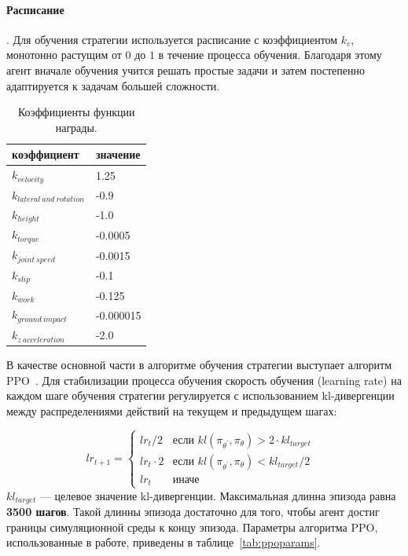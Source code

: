 \paragraph{Расписание}. Для обучения стратегии используется расписание с коэффициентом  $k_c$, монотонно растущим от $0$ до $1$ в течение процесса обучения. Благодаря этому агент вначале обучения учится решать простые задачи и затем постепенно адаптируется к задачам большей сложности.

\begin{table} [htbp]
    \centering
    \begin{threeparttable}
        \caption{Коэффициенты функции награды.}\label{tab:rcoeff}
        \begin{tabular}{| p{8cm} || p{8cm} |}
            \hline
            \hline
            коэффициент & значение \\
            \hline
            $k_{velocity}$ &	1.25 \\
            $k_{lateral\ and\ rotation}$ &	-0.9 \\
            $k_{height}$	& -1.0 \\
            $k_{torque}$	& -0.0005 \\ 
            $k_{joint\ speed}$ &	-0.0015 \\
            $k_{slip}$ &	-0.1 \\
            $k_{work}$ &	-0.125 \\
            $k_{ground\ impact}$ &	-0.000015 \\
            $k_{z\ acceleration}$ &	-2.0 \\
            \hline
            \hline
        \end{tabular}
    \end{threeparttable}
\end{table}


В качестве основной части в алгоритме обучения стратегии выступает алгоритм PPO~\cite{Schulman2017ProximalPO}. Для стабилизации процесса обучения скорость обучения (learning rate) на каждом шаге обучения стратегии регулируется с использованием kl-дивергенции между распределениями действий на текущем и предыдущем шагах:

\begin{equation}
  lr_{t+1} =
    \begin{cases}
      lr_t / 2 & \text{если $kl(\pi_{\theta^{\prime}}, \pi_{\theta}) > 2 \cdot kl_{target}$ }\\
      lr_t \cdot 2 & \text{если $kl(\pi_{\theta^{\prime}}, \pi_{\theta}) < kl_{target} / 2$ }\\
      lr_t & \text{иначе}
    \end{cases}     
\end{equation}
$kl_{target}$ --- целевое значение kl-дивергенции. Максимальная длинна эпизода равна \textbf{3500 шагов}. Такой длинны эпизода достаточно для того, чтобы агент достиг границы симуляционной среды к концу эпизода. Параметры алгоритма PPO, использованные в работе, приведены в таблице~\ref{tab:ppoparams}.

